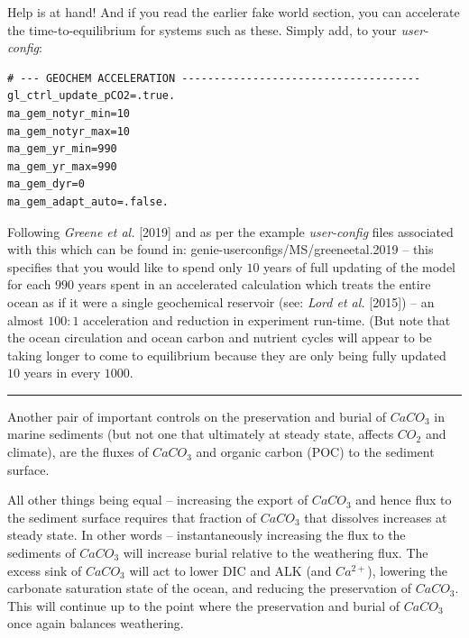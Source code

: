 Help is at hand! And if you read the earlier fake world section, you can accelerate the time-to-equilibrium for systems such as these. Simply add, to your \textit{user-config}:

\vspace{-1mm}\small\begin{verbatim}
# --- GEOCHEM ACCELERATION -------------------------------------
gl_ctrl_update_pCO2=.true.
ma_gem_notyr_min=10
ma_gem_notyr_max=10
ma_gem_yr_min=990
ma_gem_yr_max=990
ma_gem_dyr=0
ma_gem_adapt_auto=.false.
\end{verbatim}\normalsize\vspace{-1mm}
Following \textit{Greene et al.} [2019] and as per the example \textit{user-config} files associated with this which can be found in: \textsf{\footnotesize genie-userconfigs/MS/greeneetal.2019} -- this specifies that you would like to spend only \(10\) years of full updating of the model for each \(990\) years spent in an accelerated calculation which treats the entire ocean as if it were a single geochemical reservoir (see: \textit{Lord et al.} [2015]) -- an almost \(100:1\) acceleration and reduction in experiment run-time. (But note that the ocean circulation and ocean carbon and nutrient cycles will appear to be taking longer to come to equilibrium because they are only being fully updated \(10\) years in every \(1000\).

\vspace{1mm}\noindent\rule{4cm}{0.1mm}\vspace{2mm}

\noindent Another pair of important controls on the preservation and burial of \(CaCO_{3}\) in marine sediments (but not one that ultimately at steady state, affects \(CO_{2}\) and climate), are the fluxes of \(CaCO_{3}\) and  organic carbon (POC) to the sediment surface.

All other things being equal -- increasing the export of \(CaCO_{3}\) and hence flux to the sediment surface requires that fraction of \(CaCO_{3}\) that dissolves increases at steady state. In other words -- instantaneously increasing the flux to the sediments of \(CaCO_{3}\) will increase burial relative to the weathering flux. The excess sink of \(CaCO_{3}\) will act to lower DIC and ALK (and \(Ca^{2+}\)), lowering the carbonate saturation state of the ocean, and reducing the preservation of \(CaCO_{3}\). This will continue up to the point where the preservation and burial of \(CaCO_{3}\) once again balances weathering.

